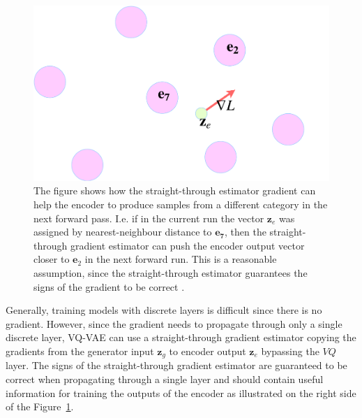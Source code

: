 \documentclass{article}
\begin{document}
\begin{figure}[tb]
\vskip 5mm
\begin{center}
\centerline{\includegraphics[width=0.8\columnwidth]{report/figures/embedding.pdf}}
\caption{The figure shows how the straight-through estimator gradient can help the encoder to produce samples from a different category in the next forward pass. I.e. if in the current run the vector $\mathbf{z}_e$ was assigned by nearest-neighbour distance to $\mathbf{e_7}$, then the straight-through gradient estimator can push the encoder output vector closer to $\mathbf{e}_2$ in the next forward run. This is a reasonable assumption, since the straight-through estimator guarantees the signs of the gradient to be correct \citep{Bengio2013}.}
\label{fig:vq-vae-embedding}
\end{center}
\vskip -5mm
\end{figure} 

Generally, training models with discrete layers is difficult since there is no gradient. However, since the gradient needs to propagate through only a single discrete layer, VQ-VAE can use a straight-through gradient estimator copying the gradients from the generator input $\mathbf{z}_g$ to encoder output $\mathbf{z}_e$ bypassing the $VQ$ layer. The signs of the straight-through gradient estimator are guaranteed to be correct when propagating through a single layer \citep{Bengio2013} and should contain useful information for training the outputs of the encoder as illustrated on the right side of the Figure~\ref{fig:vq-vae-embedding}.
\end{document}
